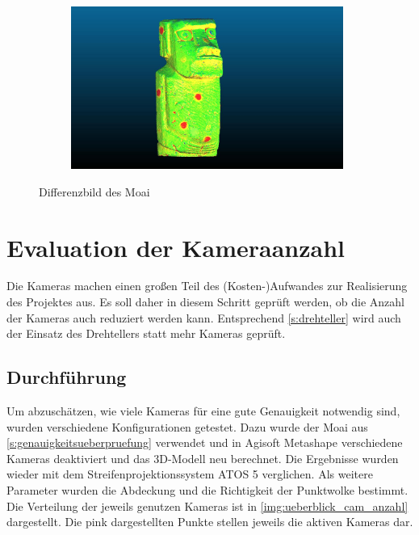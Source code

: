 \documentclass[./00PhotoBox.tex]{subfiles}
\begin{document}
\begin{figure}
\begin{subfigure}{0.10\textwidth}
    \end{subfigure}
    \begin{subfigure}{0.85\textwidth}
        \includegraphics[width=0.98\textwidth]{img/moai_fehler_drehteller.jpg}
    \end{subfigure}
    \caption{Differenzbild des Moai}
    \label{img:differenz_moai}
\end{figure}



\section{Evaluation der Kameraanzahl}
\label{s:kameraanzahl}
Die Kameras machen einen großen Teil des (Kosten-)Aufwandes zur Realisierung des Projektes aus. Es soll daher in diesem Schritt geprüft werden, ob die Anzahl der Kameras auch reduziert werden kann. Entsprechend \autoref{s:drehteller} wird auch der Einsatz des Drehtellers statt mehr Kameras geprüft.

\subsection{Durchführung}
Um abzuschätzen, wie viele Kameras für eine gute Genauigkeit notwendig sind, wurden verschiedene Konfigurationen getestet. Dazu wurde der Moai aus \autoref{s:genauigkeitsueberpruefung} verwendet und in Agisoft Metashape verschiedene Kameras deaktiviert und das 3D-Modell neu berechnet. Die Ergebnisse wurden wieder mit dem Streifenprojektionssystem ATOS 5 verglichen. Als weitere Parameter wurden die Abdeckung und die Richtigkeit der Punktwolke bestimmt. Die Verteilung der jeweils genutzen Kameras ist in \autoref{img:ueberblick_cam_anzahl} dargestellt. Die pink dargestellten Punkte stellen jeweils die aktiven Kameras dar.
\end{document}
